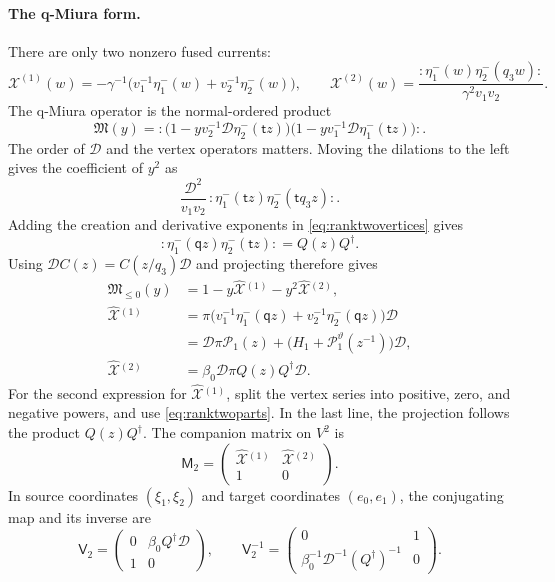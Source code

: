 \documentclass[11pt]{amsart}
\theoremstyle{definition}
\theoremstyle{remark}
\newcommand{\Mq}{\mathsf q}                      %
\newcommand{\Mt}{\mathsf t}                      %
\newcommand{\betaz}{\beta_0}                     %
\newcommand{\Cartan}[1]{H_{#1}}                  %
\newcommand{\auxe}[1]{e_{#1}}                    %
\newcommand{\DD}{\mathcal D}
\newcommand{\Pser}[1]{\mathcal P_{#1}}           %
\newcommand{\Xk}[1]{\mathcal X^{(#1)}}           %
\newcommand{\Xhat}[1]{\widehat{\mathcal X}{}^{(#1)}}   %
\newcommand{\MM}{\mathsf M}
\newcommand{\Miura}[1]{\MM_{#1}}                 %
\newcommand{\VV}{\mathsf V}
\newcommand{\Vconj}[1]{\VV_{#1}}                 %
\newcommand{\Miuraop}{\mathfrak M}               %
\newcommand{\Miuraproj}{\Miuraop_{\leq0}}         %
\newcommand{\Qcr}{Q}                             %
\newcommand{\Qan}{Q^\dagger}                     %
\begin{document}
\paragraph{The q-Miura form.}
There are only two nonzero fused currents:
\[
 \Xk{1}(w)=-\gamma^{-1}
       \bigl(v_1^{-1}\eta^-_1(w)+v_2^{-1}\eta^-_2(w)\bigr),
 \qquad
 \Xk{2}(w)=\frac{{:}\eta^-_1(w)\eta^-_2(q_3w){:}}{\gamma^2v_1v_2}.
\]
The q-Miura operator is the normal-ordered product
\begin{equation}\label{eq:ranktwomiuraproduct}
 \Miuraop(y)
 ={:}\bigl(1-yv_2^{-1}\DD\eta^-_2(\Mt z)\bigr)
      \bigl(1-yv_1^{-1}\DD\eta^-_1(\Mt z)\bigr){:}.
\end{equation}
The order of \(\DD\) and the vertex operators matters.
Moving the dilations to the left gives the coefficient of \(y^2\) as
\[
 \frac{\DD^2}{v_1v_2}\,{:}\eta^-_1(\Mt z)\eta^-_2(\Mt q_3z){:}.
\]
Adding the creation and derivative exponents in \eqref{eq:ranktwovertices} gives
\begin{equation}\label{eq:ranktwofusion}
 {:}\eta^-_1(\Mq z)\eta^-_2(\Mt z){:}=\Qcr(z)\Qan.
\end{equation}
Using \(\DD C(z)=C(z/q_3)\DD\) and projecting therefore gives
\begin{equation}\label{eq:ranktwomiuracoefficients}
 \begin{aligned}
 \Miuraproj(y)&=1-y\Xhat{1}-y^2\Xhat{2},\\
 \Xhat{1}
   &=\pi\bigl(v_1^{-1}\eta^-_1(\Mq z)+v_2^{-1}\eta^-_2(\Mq z)\bigr)\DD\\
   &=\DD\pi\Pser{1}(z)+
       \bigl(\Cartan{1}+\Pser{1}^\vartheta(z^{-1})\bigr)\DD,\\
 \Xhat{2}&=\betaz\DD\pi\Qcr(z)\Qan\DD.
 \end{aligned}
\end{equation}
For the second expression for \(\Xhat{1}\), split the vertex series into
positive, zero, and negative powers, and use \eqref{eq:ranktwoparts}.
In the last line, the projection follows the product \(\Qcr(z)\Qan\).
The companion matrix on \(V^2\) is
\[
 \Miura{2}=\begin{pmatrix}\Xhat{1}&\Xhat{2}\\1&0\end{pmatrix}.
\]
In source coordinates \((\xi_1,\xi_2)\) and target coordinates
\((\auxe{0},\auxe{1})\), the conjugating map and its inverse are
\begin{equation}\label{eq:ranktwoconjugator}
 \Vconj{2}=
 \begin{pmatrix}0&\betaz\Qan\DD\\1&0\end{pmatrix},
 \qquad
 \Vconj{2}^{-1}=
 \begin{pmatrix}0&1\\\betaz^{-1}\DD^{-1}(\Qan)^{-1}&0\end{pmatrix}.
\end{equation}
\end{document}
